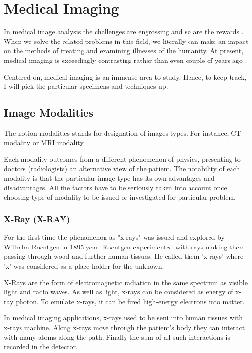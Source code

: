 \chapter{Medical Imaging}
\label{ch:rworks}

In medical image analysis the challenges are engrossing and so are the rewards \cite{Duncan2000}. When we solve the related problems in this field, we literally can make an impact on the methods of treating and examining illnesses of the humanity. At present, medical imaging is exceedingly contrasting rather than even couple of years ago \cite{Wang2020}. 

Centered on, medical imaging is an immense area to study. Hence, to keep track, I will pick the particular specimens and techniques up.

\section{Image Modalities}
The notion modalities \cite{Seeram2004} stands for designation of images types. For instance, CT modality or MRI modality. 

Each modality outcomes from a different phenomenon of physics, presenting to doctors (radiologists) an alternative view of the patient. The notability of each modality is that the particular image type has its own advantages and disadvantages. All the factors have to be seriously taken into account once choosing type of modality to be issued or investigated for particular problem.

\subsection{X-Ray (X-RAY)}
For the first time the phenomenon as "x-rays" was issued and explored by Wilhelm Roentgen in 1895 year. Roentgen experimented with rays making them passing through wood and further human tissues. He called them \cite{Barker1996} 'x-rays' where 'x' was considered as a place-holder for the unknown.

X-Rays are the form of electromagnetic radiation in the same spectrum as visible light and radio waves. As well as light, x-rays can be considered as energy of x-ray photon. To emulate x-rays, it can be fired high-energy electrons into matter. 

In medical imaging applications, x-rays used to be sent into human tissues with x-rays machine. Along x-rays move through the patient's body they can interact with many atoms along the path. Finally the sum of all such interactions is recorded in the detector. 

